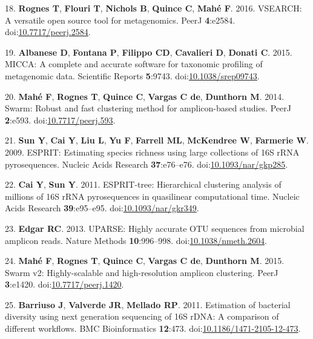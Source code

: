 \documentclass[11pt,]{article}
\begin{document}
\hypertarget{ref-Rognes2016}{}
18. \textbf{Rognes T}, \textbf{Flouri T}, \textbf{Nichols B},
\textbf{Quince C}, \textbf{Mahé F}. 2016. VSEARCH: A versatile open
source tool for metagenomics. PeerJ \textbf{4}:e2584.
doi:\href{https://doi.org/10.7717/peerj.2584}{10.7717/peerj.2584}.

\hypertarget{ref-Albanese2015}{}
19. \textbf{Albanese D}, \textbf{Fontana P}, \textbf{Filippo CD},
\textbf{Cavalieri D}, \textbf{Donati C}. 2015. MICCA: A complete and
accurate software for taxonomic profiling of metagenomic data.
Scientific Reports \textbf{5}:9743.
doi:\href{https://doi.org/10.1038/srep09743}{10.1038/srep09743}.

\hypertarget{ref-Mah2014}{}
20. \textbf{Mahé F}, \textbf{Rognes T}, \textbf{Quince C},
\textbf{Vargas C de}, \textbf{Dunthorn M}. 2014. Swarm: Robust and fast
clustering method for amplicon-based studies. PeerJ \textbf{2}:e593.
doi:\href{https://doi.org/10.7717/peerj.593}{10.7717/peerj.593}.

\hypertarget{ref-Sun2009}{}
21. \textbf{Sun Y}, \textbf{Cai Y}, \textbf{Liu L}, \textbf{Yu F},
\textbf{Farrell ML}, \textbf{McKendree W}, \textbf{Farmerie W}. 2009.
ESPRIT: Estimating species richness using large collections of 16S rRNA
pyrosequences. Nucleic Acids Research \textbf{37}:e76--e76.
doi:\href{https://doi.org/10.1093/nar/gkp285}{10.1093/nar/gkp285}.

\hypertarget{ref-Cai2011}{}
22. \textbf{Cai Y}, \textbf{Sun Y}. 2011. ESPRIT-tree: Hierarchical
clustering analysis of millions of 16S rRNA pyrosequences in quasilinear
computational time. Nucleic Acids Research \textbf{39}:e95--e95.
doi:\href{https://doi.org/10.1093/nar/gkr349}{10.1093/nar/gkr349}.

\hypertarget{ref-Edgar2013}{}
23. \textbf{Edgar RC}. 2013. UPARSE: Highly accurate OTU sequences from
microbial amplicon reads. Nature Methods \textbf{10}:996--998.
doi:\href{https://doi.org/10.1038/nmeth.2604}{10.1038/nmeth.2604}.

\hypertarget{ref-Mah2015}{}
24. \textbf{Mahé F}, \textbf{Rognes T}, \textbf{Quince C},
\textbf{Vargas C de}, \textbf{Dunthorn M}. 2015. Swarm v2:
Highly-scalable and high-resolution amplicon clustering. PeerJ
\textbf{3}:e1420.
doi:\href{https://doi.org/10.7717/peerj.1420}{10.7717/peerj.1420}.

\hypertarget{ref-Barriuso2011}{}
25. \textbf{Barriuso J}, \textbf{Valverde JR}, \textbf{Mellado RP}.
2011. Estimation of bacterial diversity using next generation sequencing
of 16S rDNA: A comparison of different workflows. BMC Bioinformatics
\textbf{12}:473.
doi:\href{https://doi.org/10.1186/1471-2105-12-473}{10.1186/1471-2105-12-473}.
\end{document}
